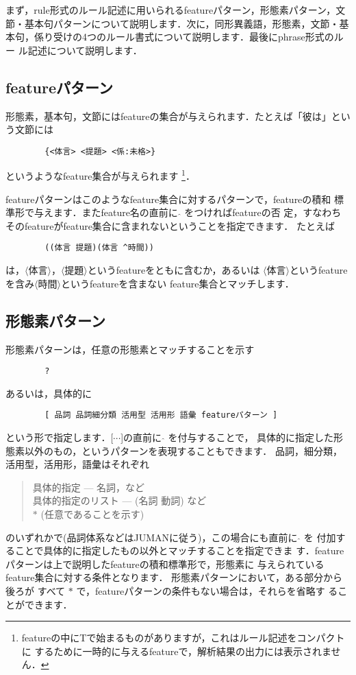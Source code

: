 \documentclass[a4j,11pt,titlepage]{jarticle}
\def\fl{$\langle$}
\def\fr{$\rangle$}
\begin{document}
まず，rule形式のルール記述に用いられるfeatureパターン，形態素パターン，文
節・基本句パターンについて説明します．次に，同形異義語，形態素，文節・基
本句，係り受けの4つのルール書式について説明します．最後にphrase形式のルー
ル記述について説明します．


\subsection{featureパターン}

形態素，基本句，文節にはfeatureの集合が与えられます．たとえば「彼は」とい
う文節には
\begin{verbatim}
        {<体言> <提題> <係:未格>}  
\end{verbatim}
というようなfeature集合が与えられます
\footnote{
featureの中にTで始まるものがありますが，これはルール記述をコンパクトに
するために一時的に与えるfeatureで，解析結果の出力には表示されません．}．

featureパターンはこのようなfeature集合に対するパターンで，featureの積和
標準形で与えます．またfeature名の直前に $\hat{ }$ をつければfeatureの否
定，すなわちそのfeatureがfeature集合に含まれないということを指定できます．
たとえば
\begin{verbatim}
        ((体言 提題)(体言 ^時間))
\end{verbatim}
は，\fl 体言\fr ，\fl 提題\fr というfeatureをともに含むか，あるいは
\fl 体言\fr というfeatureを含み\fl 時間\fr というfeatureを含まない
feature集合とマッチします．


\subsection{形態素パターン}
\vspace{5mm}

形態素パターンは，任意の形態素とマッチすることを示す
\begin{verbatim}
        ?
\end{verbatim}
あるいは，具体的に
\begin{verbatim}
        [ 品詞 品詞細分類 活用型 活用形 語彙 featureパターン ]
\end{verbatim}
という形で指定します．[$\cdots$]の直前に $\hat{ }$ を付与することで，
具体的に指定した形態素以外のもの，というパターンを表現することもできます．
品詞，細分類，活用型，活用形，語彙はそれぞれ
\begin{quote}
  具体的指定 --- 名詞，など \\
  具体的指定のリスト --- (名詞 動詞) など \\
  $*$ (任意であることを示す)
\end{quote}
のいずれかで(品詞体系などはJUMANに従う)，この場合にも直前に $\hat{ }$ を
付加することで具体的に指定したもの以外とマッチすることを指定できま
す．featureパターンは上で説明したfeatureの積和標準形で，形態素に
与えられているfeature集合に対する条件となります．
形態素パターンにおいて，ある部分から後ろが
すべて $*$ で，featureパターンの条件もない場合は，それらを省略す
ることができます．
\end{document}
